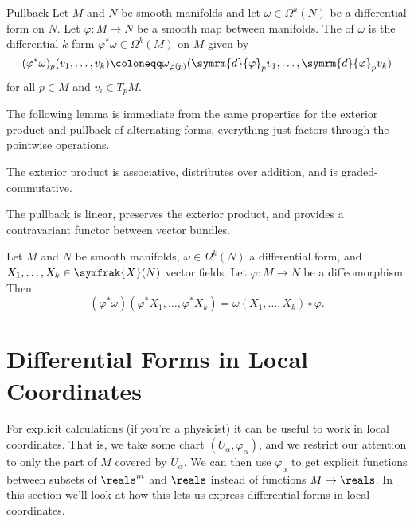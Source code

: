 \documentclass[fleqn]{NotesClass}
\renewcommand{\dl}{\symrm{d}}
\newcommand{\vectorFields}{\symfrak{X}}
\begin{document}
    \begin{dfn}{Pullback}{}
        Let \(M\) and \(N\) be smooth manifolds and let \(\omega \in \Omega^k(N)\) be a differential form on \(N\).
        Let \(\varphi \colon M \to N\) be a smooth map between manifolds.
        The  of \(\omega\) is the differential \(k\)-form \(\varphi^*\omega \in \Omega^k(M)\) on \(M\) given by
        \begin{equation}
            (\varphi^*\omega)_p(v_1, \dotsc, v_k) \coloneqq \omega_{\varphi(p)}(\dl{\varphi}_pv_1, \dotsc, \dl{\varphi}_pv_k)
        \end{equation}
        for all \(p \in M\) and \(v_i \in T_pM\).
    \end{dfn}
    
    The following lemma is immediate from the same properties for the exterior product and pullback of alternating forms, everything just factors through the pointwise operations.
    
    \begin{lma}{}{}
        The exterior product is associative, distributes over addition, and is graded-commutative.
        
        The pullback is linear, preserves the exterior product, and provides a contravariant functor between vector bundles.
    \end{lma}
    
    \begin{lma}{}{}
        Let \(M\) and \(N\) be smooth manifolds, \(\omega \in \Omega^k(N)\) a differential form, and \(X_1, \dotsc, X_k \in \vectorFields(N)\) vector fields.
        Let \(\varphi \colon M \to N\) be a diffeomorphism.
        Then 
        \begin{equation}
            (\varphi^*\omega)(\varphi^*X_1, \dotsc, \varphi^*X_k) = \omega(X_1, \dotsc, X_k) \circ \varphi.
        \end{equation}
    \end{lma}
    
    \section{Differential Forms in Local Coordinates}
    For explicit calculations (if you're a physicist) it can be useful to work in local coordinates.
    That is, we take some chart \((U_\alpha, \varphi_\alpha)\), and we restrict our attention to only the part of \(M\) covered by \(U_\alpha\).
    We can then use \(\varphi_\alpha\) to get explicit functions between subsets of \(\reals^m\) and \(\reals\) instead of functions \(M \to \reals\).
    In this section we'll look at how this lets us express differential forms in local coordinates.
    
\end{document}
